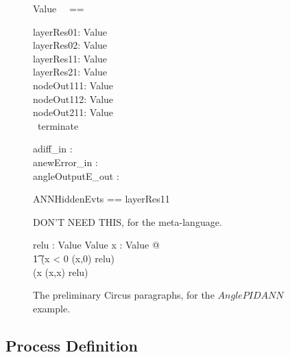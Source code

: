 \documentclass{article}
\begin{document}
\begin{figure}[t]
\begin{zed}
  Value ~~==~~ \real
\end{zed}

\begin{circus}
  \circchannel layerRes01: Value \\
  \circchannel layerRes02: Value \\
  \circchannel layerRes11: Value \\
  \circchannel layerRes21: Value \\
  \circchannel nodeOut111: Value \\
  \circchannel nodeOut112: Value \\
  \circchannel nodeOut211: Value \\
  \circchannel\ terminate \\
\end{circus}

\begin{circus}
  \circchannel adiff\_in : \real \\
  \circchannel anewError\_in : \real \\
  \circchannel angleOutputE\_out : \real \\
\end{circus}

\begin{circus}
  \circchannelset ANNHiddenEvts == \lchanset layerRes11 \rchanset
\end{circus}

DON'T NEED THIS, for the meta-language. 
\begin{axdef}
  relu : Value \fun Value %
  \where %
  \forall x : Value @ \\%
  \t1 %
  (x < 0 \implies (x,0) \in relu) \land \\%
  (x  \implies (x,x) \in relu)
\end{axdef}

  \caption{The preliminary Circus paragraphs, for the $AnglePIDANN$ example. }
  \label{anglepidann-example-preliminaries}
\end{figure} 

\subsection{Process Definition} 
\end{document}
